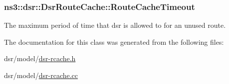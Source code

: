 \subsubsection[{\texorpdfstring{Route\+Cache\+Timeout}{RouteCacheTimeout}}]{ ns3\+::dsr\+::\+Dsr\+Route\+Cache\+::\+Route\+Cache\+Timeout\hspace{0.3cm}{\ttfamily [private]}}\hypertarget{classns3_1_1dsr_1_1DsrRouteCache_a6a2bdf2226910392a4578cc82216acaf}{}\label{classns3_1_1dsr_1_1DsrRouteCache_a6a2bdf2226910392a4578cc82216acaf}


The maximum period of time that dsr is allowed to for an unused route. 



The documentation for this class was generated from the following files\+:\begin{DoxyCompactItemize}
\item 
dsr/model/\hyperlink{dsr-rcache_8h}{dsr-\/rcache.\+h}\item 
dsr/model/\hyperlink{dsr-rcache_8cc}{dsr-\/rcache.\+cc}\end{DoxyCompactItemize}
